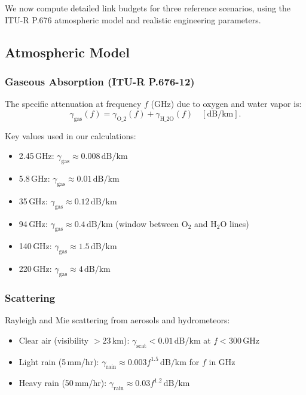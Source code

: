 \documentclass[journal,twocolumn]{IEEEtran}
\begin{document}
We now compute detailed link budgets for three reference scenarios,
using the ITU-R P.676 atmospheric model and realistic engineering
parameters.

\subsection{Atmospheric Model}

\subsubsection{Gaseous Absorption (ITU-R P.676-12)}

The specific attenuation at frequency $f$ (GHz) due to oxygen and
water vapor is:
\begin{equation}
\gamma_\text{gas}(f) = \gamma_\text{O_2}(f) + \gamma_\text{H_2O}(f)
\quad [\text{dB/km}].
\end{equation}

Key values used in our calculations:
\begin{itemize}
\item 2.45\,GHz: $\gamma_\text{gas} \approx 0.008\,\text{dB/km}$
\item 5.8\,GHz: $\gamma_\text{gas} \approx 0.01\,\text{dB/km}$
\item 35\,GHz: $\gamma_\text{gas} \approx 0.12\,\text{dB/km}$
\item 94\,GHz: $\gamma_\text{gas} \approx 0.4\,\text{dB/km}$
(window between O$_2$ and H$_2$O lines)
\item 140\,GHz: $\gamma_\text{gas} \approx 1.5\,\text{dB/km}$
\item 220\,GHz: $\gamma_\text{gas} \approx 4\,\text{dB/km}$
\end{itemize}

\subsubsection{Scattering}

Rayleigh and Mie scattering from aerosols and hydrometeors:
\begin{itemize}
\item Clear air (visibility $>$23\,km):
$\gamma_\text{scat} < 0.01\,\text{dB/km}$ at $f < 300\,\text{GHz}$
\item Light rain (5\,mm/hr):
$\gamma_\text{rain} \approx 0.003 f^{1.5}\,\text{dB/km}$ for $f$ in GHz
\item Heavy rain (50\,mm/hr):
$\gamma_\text{rain} \approx 0.03 f^{1.2}\,\text{dB/km}$
\end{itemize}
\end{document}
